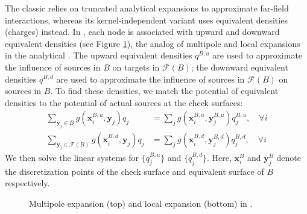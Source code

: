 The classic \fmm \cite{greengard1987fast, cheng1999fast} relies on truncated analytical expansions to approximate far-field interactions, whereas its kernel-independent variant \cite{ying2004kernel} uses equivalent densities (charges) instead.
In \kifmm, each node is associated with upward and downward equivalent densities (see Figure \ref{fig:multipole_local}), the analog of multipole and local expansions in the analytical \fmm.
The upward equivalent densities $q^{B,u}$ are used to approximate the influence of sources in $B$ on targets in $\mathcal{F}(B)$;
the downward equivalent densities $q^{B,d}$ are used to approximate the influence of sources in $\mathcal{F}(B)$ on sources in $B$.
To find these densities, we match the potential of equivalent densities to the potential of actual sources at the check surfaces:
%
\begin{align}\label{eq:multipole_local}
    \sum_{\mathbf{y}_{j} \in B} g\left(\mathbf{x}_{i}^{B,u}, \mathbf{y}_{j}\right) q_{j} &= \sum_{j} g\left(\mathbf{x}_{i}^{B,u}, \mathbf{y}^{B,u}_{j}\right) q^{B,u}_{j}, \quad \forall i  \nonumber \\
    \sum_{\mathbf{y}_{j} \in \mathcal{F}(B)} g\left(\mathbf{x}_{i}^{B,d}, \mathbf{y}_{j}\right) q_{j} &= \sum_{j} g\left(\mathbf{x}_{i}^{B,d}, \mathbf{y}^{B,d}_{j}\right) q^{B,d}_{j}, \quad \forall i
\end{align}
%
We then solve the linear systems for $\{q^{B,u}_{j}\}$ and $\{q^{B,d}_{j}\}$.
Here, $\mathbf{x}_{i}^{B}$ and $\mathbf{y}_{j}^{B}$ denote the discretization points of the check surface and equivalent surface of $B$ respectively.

\begin{figure}[t]
    \begin{subfigure}{\columnwidth}
        \centering
    \end{subfigure}

    \begin{subfigure}{\columnwidth}
        \centering
    \end{subfigure}

    \caption{Multipole expansion (top) and local expansion (bottom) in \kifmm.}
    \label{fig:multipole_local}
\end{figure}

